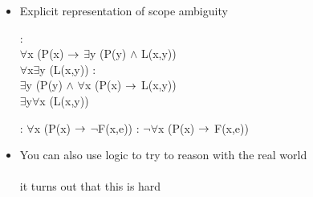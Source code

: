 \documentclass[a4paper,landscape,headrule,footrule,xetex]{foils}
\begin{document}
\begin{itemize}
\item Explicit representation of scope ambiguity
  \begin{exe}
    \ex {}
    \begin{xlist}
          \ex {}:  
          \\ $\forall$x (P(x) $\rightarrow$ $\exists$y (P(y) $\wedge$ L(x,y))
          \\ $\forall$x$\exists$y (L(x,y))
          \ex {}: 
          \\   $\exists$y (P(y) $\wedge$ $\forall$x (P(x) $\rightarrow$ L(x,y))
          \\  $\exists$y$\forall$x (L(x,y))
    \end{xlist}
    \ex {}
    \begin{xlist}
          \ex {}:  
          $\forall$x (P(x)  $\rightarrow$  $\neg$F(x,e))
          \ex {}:  
          $\neg\forall$x (P(x)  $\rightarrow$  F(x,e))
    \end{xlist}
  \end{exe}
\item You can also use logic to try to reason with the real world
   \\ 
   \\ it turns out that this is hard
\end{itemize}



\end{document}
